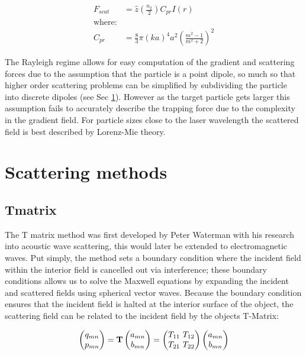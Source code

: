 \begin{align}
	F_{scat} &= \hat{z} \left(\frac{n_2}{2}\right) C_{pr} I(r) \\
	\text{where:} \nonumber \\
	C_{pr} &= \frac{8}{3} \pi (ka)^4 a^2 \left(\frac{m^2-1}{m^2+2}\right)^2
\end{align}

The Rayleigh regime allows for easy computation of the gradient and scattering forces due to the assumption that the particle is a point dipole, so much so that higher order scattering problems can be simplified by subdividing the particle into discrete dipoles (see Sec \ref{sec:scattering}). However as the target particle gets larger this assumption fails to accurately describe the trapping force due to the complexity in the gradient field. For particle sizes close to the laser wavelength the scattered field is best described by Lorenz-Mie theory. 

\section{Scattering methods}
\label{sec:scattering}
\subsection{Tmatrix}
The T matrix method was first developed by Peter Waterman with his 
research into acoustic wave scattering, this would later be extended to 
electromagnetic waves. Put simply, the method sets a boundary condition 
where the incident field within the interior field is cancelled out via 
interference; these boundary conditions allows us to solve the Maxwell 
equations by expanding the incident and scattered fields using spherical 
vector waves. Because the boundary condition ensures that the incident field is halted at the interior surface of the object, the scattering field can be related to the incident field by the objects T-Matrix:

\begin{align}
	\begin{pmatrix}
		q_{mn} \\
		p_{mn} 
	\end{pmatrix}
	= \bold{T} 
	\begin{pmatrix}
		a_{mn} \\
		b_{mn}
	\end{pmatrix}
	= \begin{pmatrix}
		T_{11} \ T_{12} \\
		T_{21} \ T_{22}
	\end{pmatrix}
	\begin{pmatrix}
		a_{mn} \\
		b_{mn}
	\end{pmatrix}
\end{align}

